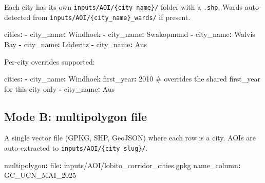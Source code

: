\documentclass[
  letterpaper,
  DIV=11,
  numbers=noendperiod]{scrreprt}
\newenvironment{Shaded}{\begin{snugshade}}{\end{snugshade}}
\newcommand{\AttributeTok}[1]{\textcolor[rgb]{0.40,0.45,0.13}{#1}}
\newcommand{\CommentTok}[1]{\textcolor[rgb]{0.37,0.37,0.37}{#1}}
\newcommand{\DecValTok}[1]{\textcolor[rgb]{0.68,0.00,0.00}{#1}}
\newcommand{\FunctionTok}[1]{\textcolor[rgb]{0.28,0.35,0.67}{#1}}
\newcommand{\KeywordTok}[1]{\textcolor[rgb]{0.00,0.23,0.31}{\textbf{#1}}}
\begin{document}
Each city has its own \texttt{inputs/AOI/\{city\_name\}/} folder with a
\texttt{.shp}. Wards auto-detected from
\texttt{inputs/AOI/\{city\_name\}\_wards/} if present.

\begin{Shaded}
\begin{Highlighting}[]
\FunctionTok{cities}\KeywordTok{:}
\AttributeTok{  }\KeywordTok{{-}}\AttributeTok{ }\FunctionTok{city\_name}\KeywordTok{:}\AttributeTok{ Windhoek}
\AttributeTok{  }\KeywordTok{{-}}\AttributeTok{ }\FunctionTok{city\_name}\KeywordTok{:}\AttributeTok{ Swakopmund}
\AttributeTok{  }\KeywordTok{{-}}\AttributeTok{ }\FunctionTok{city\_name}\KeywordTok{:}\AttributeTok{ Walvis Bay}
\AttributeTok{  }\KeywordTok{{-}}\AttributeTok{ }\FunctionTok{city\_name}\KeywordTok{:}\AttributeTok{ Lüderitz}
\AttributeTok{  }\KeywordTok{{-}}\AttributeTok{ }\FunctionTok{city\_name}\KeywordTok{:}\AttributeTok{ Aus}
\end{Highlighting}
\end{Shaded}

Per-city overrides supported:

\begin{Shaded}
\begin{Highlighting}[]
\FunctionTok{cities}\KeywordTok{:}
\AttributeTok{  }\KeywordTok{{-}}\AttributeTok{ }\FunctionTok{city\_name}\KeywordTok{:}\AttributeTok{ Windhoek}
\AttributeTok{    }\FunctionTok{first\_year}\KeywordTok{:}\AttributeTok{ }\DecValTok{2010}\CommentTok{      \# overrides the shared first\_year for this city only}
\AttributeTok{  }\KeywordTok{{-}}\AttributeTok{ }\FunctionTok{city\_name}\KeywordTok{:}\AttributeTok{ Aus}
\end{Highlighting}
\end{Shaded}

\subsection{Mode B: multipolygon file}\label{mode-b-multipolygon-file}

A single vector file (GPKG, SHP, GeoJSON) where each row is a city. AOIs
are auto-extracted to \texttt{inputs/AOI/\{city\_slug\}/}.

\begin{Shaded}
\begin{Highlighting}[]
\FunctionTok{multipolygon}\KeywordTok{:}
\AttributeTok{  }\FunctionTok{file}\KeywordTok{:}\AttributeTok{ inputs/AOI/lobito\_corridor\_cities.gpkg}
\AttributeTok{  }\FunctionTok{name\_column}\KeywordTok{:}\AttributeTok{ GC\_UCN\_MAI\_2025}
\end{Highlighting}
\end{Shaded}
\end{document}
